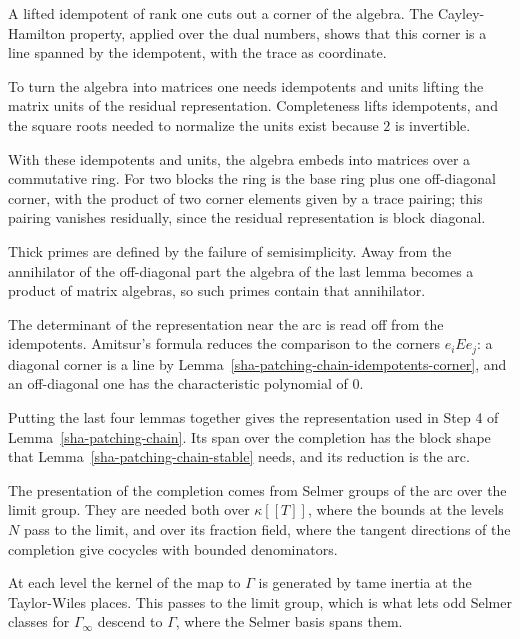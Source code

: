 A lifted idempotent of rank one cuts out a corner of the algebra. The Cayley-Hamilton property, applied over the dual numbers, shows that this corner is a line spanned by the idempotent, with the trace as coordinate.

To turn the algebra into matrices one needs idempotents and units lifting the matrix units of the residual representation. Completeness lifts idempotents, and the square roots needed to normalize the units exist because $2$ is invertible.

With these idempotents and units, the algebra embeds into matrices over a commutative ring. For two blocks the ring is the base ring plus one off-diagonal corner, with the product of two corner elements given by a trace pairing; this pairing vanishes residually, since the residual representation is block diagonal.

Thick primes are defined by the failure of semisimplicity. Away from the annihilator of the off-diagonal part the algebra of the last lemma becomes a product of matrix algebras, so such primes contain that annihilator.

The determinant of the representation near the arc is read off from the idempotents. Amitsur's formula reduces the comparison to the corners $e_iEe_j$: a diagonal corner is a line by Lemma~\ref{sha-patching-chain-idempotents-corner}, and an off-diagonal one has the characteristic polynomial of $0$.

Putting the last four lemmas together gives the representation used in Step 4 of Lemma~\ref{sha-patching-chain}. Its span over the completion has the block shape that Lemma~\ref{sha-patching-chain-stable} needs, and its reduction is the arc.

The presentation of the completion comes from Selmer groups of the arc over the limit group. They are needed both over $\kappa[[T]]$, where the bounds at the levels $N$ pass to the limit, and over its fraction field, where the tangent directions of the completion give cocycles with bounded denominators.

At each level the kernel of the map to $\Gamma$ is generated by tame inertia at the Taylor-Wiles places. This passes to the limit group, which is what lets odd Selmer classes for $\Gamma_\infty$ descend to $\Gamma$, where the Selmer basis spans them.

